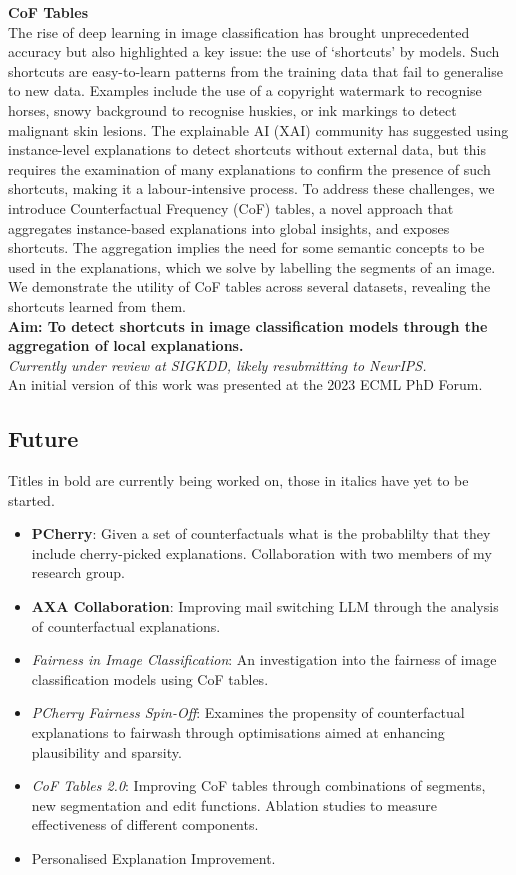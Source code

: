 \noindent
\textbf{CoF Tables}\\
The rise of deep learning in image classification has brought unprecedented accuracy but also highlighted a key 
issue: the use of `shortcuts' by models. Such shortcuts are easy-to-learn patterns from the training data that 
fail to generalise to new data. Examples include the use of a copyright watermark to recognise horses, snowy 
background to recognise huskies, or ink markings to detect malignant skin lesions. The explainable AI (XAI) 
community has suggested using instance-level explanations to detect shortcuts without external data, 
but this requires the examination of many explanations to confirm the presence of such shortcuts, making it a 
labour-intensive process. To address these challenges, we introduce Counterfactual Frequency (CoF) tables, 
a novel approach that aggregates instance-based explanations into global insights, and exposes shortcuts. 
The aggregation implies the need for some semantic concepts to be used in the explanations, which we solve by 
labelling the segments of an image. We demonstrate the utility of CoF tables across several datasets, revealing 
the shortcuts learned from them.\\
\textbf{Aim: To detect shortcuts in image classification models through the aggregation of local explanations.}\\
\textit{Currently under review at SIGKDD, likely resubmitting to NeurIPS.} \\
An initial version of this work was presented at the 2023 ECML PhD Forum.

\subsection*{Future}

Titles in bold are currently being worked on, those in italics have yet to be started.

\begin{itemize}
    \item \textbf{PCherry}: Given a set of counterfactuals what is the probablilty that they include 
    cherry-picked explanations. Collaboration with two members of my research group.
    \item \textbf{AXA Collaboration}: Improving mail switching LLM through the analysis of counterfactual explanations.
    \item \textit{Fairness in Image Classification}: An investigation into the fairness of image classification 
    models using CoF tables.
    \item \textit{PCherry Fairness Spin-Off}: Examines the propensity of counterfactual explanations to 
    fairwash through optimisations aimed at enhancing plausibility and sparsity.
    \item \textit{CoF Tables 2.0}: Improving CoF tables through combinations of segments, 
    new segmentation and edit functions. Ablation studies to measure effectiveness of different components.
    \item Personalised Explanation Improvement.
\end{itemize}